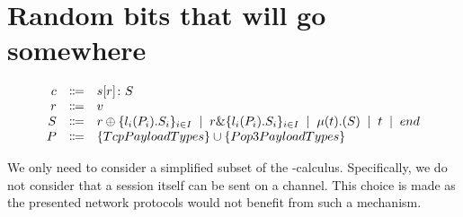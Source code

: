 \documentclass{article}
\newcommand{\sep}{\;\mid\;}
\begin{document}
\section{Random bits that will go somewhere}

\[
\begin{array}{rcl}
  \ensuremath{c}
    & \Coloneq & \ensuremath{s[r] \colon S} \cr
  \ensuremath{r}
    & \Coloneq & \ensuremath{v} \cr
  \ensuremath{S}
    & \Coloneqq & \ensuremath{r \oplus \{l_i(P_i).S_i\}_{i \in I}}
    \sep        \ensuremath{r \& \{l_i(P_i).S_i\}_{i \in I}}
    \sep        \ensuremath{\mu(t).(S)}
    \sep        \ensuremath{t}
    \sep        \ensuremath{end} \cr
  \ensuremath{P}
    & \Coloneq & \ensuremath{\{TcpPayloadTypes\} \cup \{Pop3PayloadTypes\}}
\end{array}
\]

We only need to consider a simplified subset of the \pi-calculus.
Specifically, we do not consider that a session itself can be sent on a channel.
This choice is made as the presented network protocols would not benefit from such a mechanism.

\medskip
\nocite{*}
\printbibliography
\end{document}
